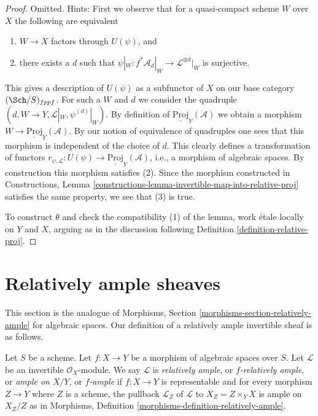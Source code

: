 \begin{proof}
Omitted. Hints:
First we observe that for a quasi-compact scheme
$W$ over $X$ the following are equivalent
\begin{enumerate}
\item $W \to X$ factors through $U(\psi)$, and
\item there exists a $d$ such that
$\psi|_W : f^*\mathcal{A}_d|_W \to \mathcal{L}^{\otimes d}|_W$
is surjective.
\end{enumerate}
This gives a description of $U(\psi)$ as a subfunctor of $X$
on our base category $(\Sch/S)_{fppf}$. For such a $W$ and $d$
we consider the quadruple
$(d, W \to Y, \mathcal{L}|_W, \psi^{(d)}|_W)$.
By definition of $\underline{\text{Proj}}_Y(\mathcal{A})$
we obtain a morphism $W \to \underline{\text{Proj}}_Y(\mathcal{A})$.
By our notion of equivalence of quadruples one sees that
this morphism is independent of the choice of $d$.
This clearly defines a transformation of functors
$r_{\psi, \mathcal{L}} : U(\psi) \to \underline{\text{Proj}}_Y(\mathcal{A})$,
i.e., a morphism of algebraic spaces.
By construction this morphism satisfies (2).
Since the morphism constructed in
Constructions, Lemma \ref{constructions-lemma-invertible-map-into-relative-proj}
satisfies the same property, we see that (3) is true.

\medskip\noindent
To construct $\theta$ and check the compatibility (1) of the
lemma, work \'etale locally on $Y$ and $X$, arguing as
in the discussion following
Definition \ref{definition-relative-proj}.
\end{proof}








\section{Relatively ample sheaves}
\label{section-relatively-ample}

\noindent
This section is the analogue of
Morphisms, Section \ref{morphisms-section-relatively-ample}
for algebraic spaces.
Our definition of a relatively ample invertible sheaf is as
follows.

\begin{definition}
\label{definition-relatively-ample}
Let $S$ be a scheme.
Let $f : X \to Y$ be a morphism of algebraic spaces over $S$.
Let $\mathcal{L}$ be an invertible $\mathcal{O}_X$-module.
We say $\mathcal{L}$ is {\it relatively ample}, or {\it $f$-relatively ample},
or {\it ample on $X/Y$}, or {\it $f$-ample} if $f : X \to Y$
is representable and for every morphism $Z \to Y$
where $Z$ is a scheme, the pullback $\mathcal{L}_Z$ of $\mathcal{L}$
to $X_Z = Z \times_Y X$ is ample on $X_Z/Z$ as in
Morphisms, Definition \ref{morphisms-definition-relatively-ample}.
\end{definition}


